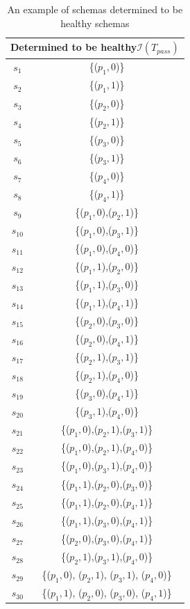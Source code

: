 \begin{table}[htbp]
  \centering
  \caption{An example of schemas determined to be healthy schemas}
  \label{ex:determinablehealthyschemas}
    \begin{tabular}{|c|c|} \hline
   \multicolumn{2}{|c|}{\textbf{ Determined to be healthy$\mathcal{I}(T_{pass})$ }}\\ \hline
   $s_{1}$ & \{($p_{1}, 0$)\} \\
   $s_{2}$ & \{($p_{1}, 1$)\} \\
   $s_{3}$ & \{($p_{2}, 0$)\} \\
   $s_{4}$ & \{($p_{2}, 1$)\} \\
   $s_{5}$ & \{($p_{3}, 0$)\} \\
   $s_{6}$ & \{($p_{3}, 1$)\} \\
   $s_{7}$ & \{($p_{4}, 0$)\} \\
   $s_{8}$ & \{($p_{4}, 1$)\} \\

   $s_{9}$ & \{($p_{1}, 0$),($p_{2}, 1$)\} \\
   $s_{10}$ & \{($p_{1}, 0$),($p_{3}, 1$)\} \\
   $s_{11}$ & \{($p_{1}, 0$),($p_{4}, 0$)\} \\
   $s_{12}$ & \{($p_{1}, 1$),($p_{2}, 0$)\} \\
   $s_{13}$ & \{($p_{1}, 1$),($p_{3}, 0$)\} \\
   $s_{14}$ & \{($p_{1}, 1$),($p_{4}, 1$)\} \\
   $s_{15}$ & \{($p_{2}, 0$),($p_{3}, 0$)\} \\
   $s_{16}$ & \{($p_{2}, 0$),($p_{4}, 1$)\} \\
   $s_{17}$ & \{($p_{2}, 1$),($p_{3}, 1$)\} \\
   $s_{18}$ & \{($p_{2}, 1$),($p_{4}, 0$)\} \\
   $s_{19}$ & \{($p_{3}, 0$),($p_{4}, 1$)\} \\
   $s_{20}$ & \{($p_{3}, 1$),($p_{4}, 0$)\} \\

   $s_{21}$ & \{($p_{1}, 0$),($p_{2}, 1$),($p_{3}, 1$)\} \\
   $s_{22}$ & \{($p_{1}, 0$),($p_{2}, 1$),($p_{4}, 0$)\} \\
   $s_{23}$ & \{($p_{1}, 0$),($p_{3}, 1$),($p_{4}, 0$)\} \\
   $s_{24}$ & \{($p_{1}, 1$),($p_{2}, 0$),($p_{3}, 0$)\} \\
   $s_{25}$ & \{($p_{1}, 1$),($p_{2}, 0$),($p_{4}, 1$)\} \\
   $s_{26}$ & \{($p_{1}, 1$),($p_{3}, 0$),($p_{4}, 1$)\} \\
   $s_{27}$ & \{($p_{2}, 0$),($p_{3}, 0$),($p_{4}, 1$)\} \\
   $s_{28}$ & \{($p_{2}, 1$),($p_{3}, 1$),($p_{4}, 0$)\} \\

   $s_{29}$ & \{($p_{1}, 0$), ($p_{2}, 1$), ($p_{3}, 1$), ($p_{4}, 0$)\} \\
   $s_{30}$ & \{($p_{1}, 1$), ($p_{2}, 0$), ($p_{3}, 0$), ($p_{4}, 1$)\} \\ \hline
    \end{tabular}%
\end{table}



